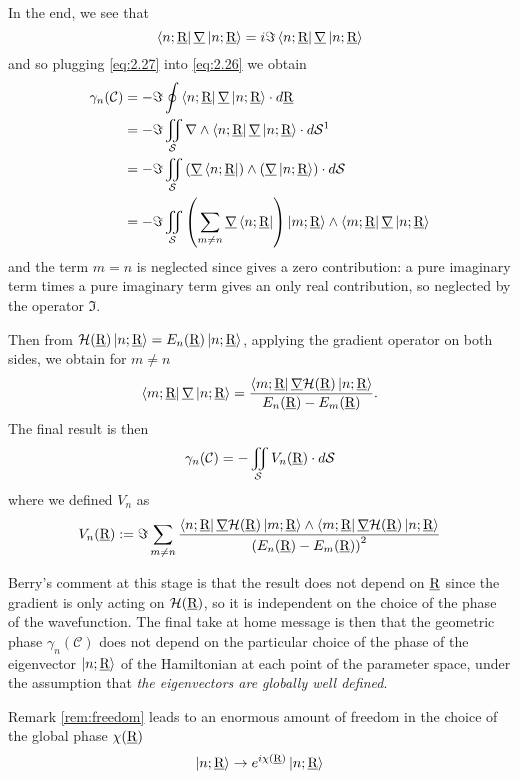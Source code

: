 In the end, we see that 
\begin{equation}
\Bra{n;\underline{\textrm{R}}}\underline{\nabla}\Ket{n;\underline{\textrm{R}}}=i\Im\Bra{n;\underline{\textrm{R}}}\underline{\nabla}\Ket{n;\underline{\textrm{R}}}
\label{eq:2.27}
\end{equation}
and so plugging \eqref{eq:2.27} into \eqref{eq:2.26} we obtain
\begin{align}
\gamma_n(\mathcal{C})&=-\Im \oint \Bra{n;\rp}\underline{\nabla}\Ket{n;\rp}\cdot\diff\rp\\
&=-\Im\iint_{\mathcal{S}}\nabla\wedge\Bra{n;\rp}\underline{\nabla}\Ket{n;\rp}\cdot\diff\mathcal{S}\text{\footnotemark}\\
&=-\Im\iint_{\mathcal{S}}\left(\underline{\nabla}\Bra{n;\rp}\right)\wedge\left(\underline{\nabla}\Ket{n;\rp}\right)\cdot\diff\mathcal{S}\\
&= -\Im \iint_{\mathcal{S}}\left(\sum_{m\neq n}\underline{\nabla}\Bra{n;\rp}\right)\Ket{m;\rp}\wedge\Bra{m;\rp}\underline{\nabla}\Ket{n;\rp}
\end{align}
and the term $ m=n $ is neglected since gives a zero contribution: a pure imaginary term times a pure imaginary term gives an only real contribution, so neglected by the operator $ \Im. $

Then from $ \mathcal{H}(\underline{\textrm{R}})\Ket{n;\underline{\textrm{R}}}=E_n(\underline{\textrm{R}})\Ket{n;\underline{\textrm{R}}} $, applying the gradient operator on both sides, we obtain for $ m\neq n $
\begin{equation}
\Bra{m;\underline{\textrm{R}}}\underline{\nabla}\Ket{n;\underline{\textrm{R}}}=\dfrac{\Bra{m;\underline{\textrm{R}}}\underline{\nabla}\mathcal{H}(\underline{\textrm{R}})\Ket{n;\underline{\textrm{R}}}}{E_n(\underline{\textrm{R}})-E_m(\underline{\textrm{R}})}.
\end{equation}
The final result is then
\begin{equation}
\gamma_n(\mathcal{C})=-\iint_{\mathcal{S}}V_n(\underline{\textrm{R}})\cdot\mathop{}\!d\mathcal{S}
\end{equation}
where we defined $ V_n $ as 
\begin{equation}
V_n(\underline{\textrm{R}}):=\Im\sum_{m\neq n}\dfrac{\Bra{n;\underline{\textrm{R}}}\underline{\nabla}\mathcal{H}(\underline{\textrm{R}})\Ket{m;\underline{\textrm{R}}}\wedge\Bra{m;\underline{\textrm{R}}}\underline{\nabla}\mathcal{H}(\underline{\textrm{R}})\Ket{n;\underline{\textrm{R}}}}{\left(E_n(\underline{\textrm{R}})-E_m(\underline{\textrm{R}})\right)^2}
\label{eq:2.31}
\end{equation}
\begin{rem}
	Berry's comment at this stage is that the result does not depend on $ \underline{\textrm{R}} $ since the gradient is only acting on $ \mathcal{H}(\underline{\textrm{R}}) $, so it is independent on the choice of the phase of the wavefunction. The final take at home message is then that the geometric phase $ \gamma_n(\mathcal{C}) $ does not depend on the particular choice of the phase of the eigenvector $ \Ket{n;\underline{\textrm{R}}} $ of the Hamiltonian at each point of the parameter space, under the assumption that \emph{the eigenvectors are globally well defined}.
	\label{rem:freedom}
\end{rem}
Remark \ref{rem:freedom} leads to an enormous amount of freedom in the choice of the global phase $ \chi(\underline{\textrm{R}}) $
\begin{equation}
\Ket{n;\underline{\textrm{R}}}\to e^{i\chi(\underline{\textrm{R}})}\Ket{n;\underline{\textrm{R}}}
\end{equation}
